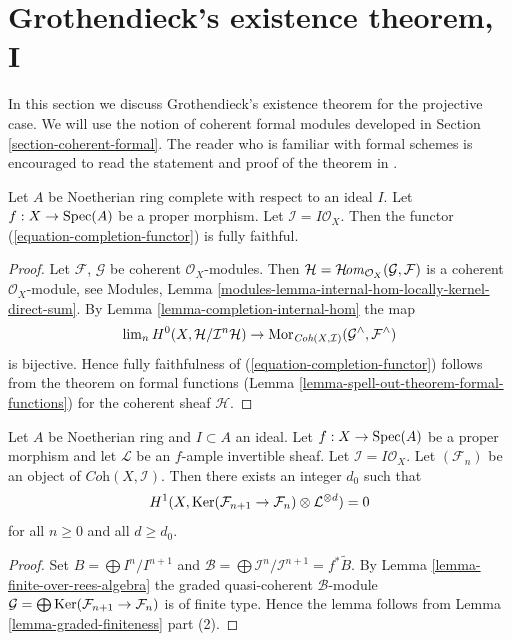 \section{Grothendieck's existence theorem, I}
\label{section-existence}

\noindent
In this section we discuss Grothendieck's existence theorem for the
projective case. We will use the notion of coherent formal modules
developed in Section \ref{section-coherent-formal}. The reader who is familiar
with formal schemes is encouraged to read the statement and proof
of the theorem in \cite{EGA}.

\begin{lemma}
\label{lemma-fully-faithful}
Let $A$ be Noetherian ring complete with respect to an ideal $I$.
Let $f : X \to \mathop{\mathrm{Spec}}(A)$ be a proper morphism. Let
$\mathcal{I} = I\mathcal{O}_X$.
Then the functor (\ref{equation-completion-functor}) is fully faithful.
\end{lemma}

\begin{proof}
Let $\mathcal{F}$, $\mathcal{G}$ be coherent $\mathcal{O}_X$-modules.
Then $\mathcal{H} = \mathop{\mathcal{H}\!\mathit{om}}\nolimits_{\mathcal{O}_X}(\mathcal{G}, \mathcal{F})$
is a coherent $\mathcal{O}_X$-module, see
Modules, Lemma \ref{modules-lemma-internal-hom-locally-kernel-direct-sum}.
By Lemma \ref{lemma-completion-internal-hom} the map
$$
\mathop{\mathrm{lim}}\nolimits_n H^0(X, \mathcal{H}/\mathcal{I}^n\mathcal{H})
\to
\mathop{\mathrm{Mor}}\nolimits_{\textit{Coh}(X, \mathcal{I})}
(\mathcal{G}^\wedge, \mathcal{F}^\wedge)
$$
is bijective. Hence fully faithfulness of
(\ref{equation-completion-functor}) follows from the theorem on formal
functions (Lemma \ref{lemma-spell-out-theorem-formal-functions})
for the coherent sheaf $\mathcal{H}$.
\end{proof}

\begin{lemma}
\label{lemma-vanishing-projective}
Let $A$ be Noetherian ring and $I \subset A$ an ideal.
Let $f : X \to \mathop{\mathrm{Spec}}(A)$ be a proper morphism and let
$\mathcal{L}$ be an $f$-ample invertible sheaf. Let
$\mathcal{I} = I\mathcal{O}_X$. Let $(\mathcal{F}_n)$ be an
object of $\textit{Coh}(X, \mathcal{I})$. Then there exists an
integer $d_0$ such that
$$
H^1(X, \mathop{\mathrm{Ker}}(\mathcal{F}_{n + 1} \to \mathcal{F}_n)
\otimes \mathcal{L}^{\otimes d} )
= 0
$$
for all $n \geq 0$ and all $d \geq d_0$.
\end{lemma}

\begin{proof}
Set $B = \bigoplus I^n/I^{n + 1}$ and
$\mathcal{B} = \bigoplus \mathcal{I}^n/\mathcal{I}^{n + 1} = f^*\widetilde{B}$.
By Lemma \ref{lemma-finite-over-rees-algebra} the graded quasi-coherent
$\mathcal{B}$-module
$\mathcal{G} = \bigoplus \mathop{\mathrm{Ker}}(\mathcal{F}_{n + 1} \to \mathcal{F}_n)$
is of finite type. Hence the lemma follows from
Lemma \ref{lemma-graded-finiteness} part (2).
\end{proof}

